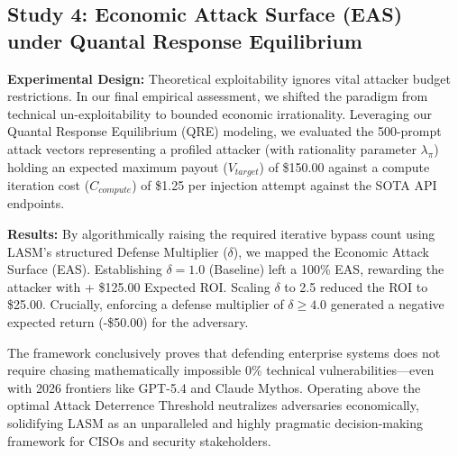 \subsection{Study 4: Economic Attack Surface (EAS) under Quantal Response Equilibrium}
\label{subsec:study4}

\textbf{Experimental Design:} Theoretical exploitability ignores vital attacker budget restrictions. In our final empirical assessment, we shifted the paradigm from technical un-exploitability to bounded economic irrationality. Leveraging our Quantal Response Equilibrium (QRE) modeling, we evaluated the 500-prompt attack vectors representing a profiled attacker (with rationality parameter $\lambda_\pi$) holding an expected maximum payout ($V_{target}$) of \$150.00 against a compute iteration cost ($C_{compute}$) of \$1.25 per injection attempt against the SOTA API endpoints.

\textbf{Results:} By algorithmically raising the required iterative bypass count using LASM's structured Defense Multiplier ($\delta$), we mapped the Economic Attack Surface (EAS). Establishing $\delta = 1.0$ (Baseline) left a 100\% EAS, rewarding the attacker with + \$125.00 Expected ROI. Scaling $\delta$ to 2.5 reduced the ROI to \$25.00. Crucially, enforcing a defense multiplier of $\delta \geq 4.0$ generated a negative expected return (-\$50.00) for the adversary. 

\begin{table}[h!]
\centering
\caption{Attack Deterrence Threshold (ADT) Optimization.}
\label{tab:adt_results}
\end{table}

The framework conclusively proves that defending enterprise systems does not require chasing mathematically impossible 0\% technical vulnerabilities—even with 2026 frontiers like GPT-5.4 and Claude Mythos. Operating above the optimal Attack Deterrence Threshold neutralizes adversaries economically, solidifying LASM as an unparalleled and highly pragmatic decision-making framework for CISOs and security stakeholders.
